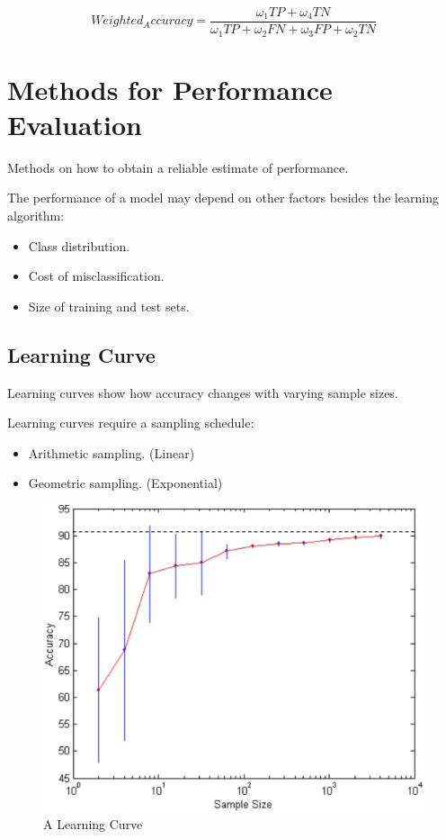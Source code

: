 \begin{equation}
    Weighted_Accuracy = \frac{\omega_1 TP + \omega_4 TN}{\omega_1 TP + \omega_2 FN + \omega_3 FP + \omega_2 TN}
\end{equation}

\section{Methods for Performance Evaluation}
Methods on how to obtain a reliable estimate of performance.

The performance of a model may depend on other factors besides the learning algorithm:
\begin{itemize}
    \item Class distribution.
    \item Cost of misclassification.
    \item Size of training and test sets.
\end{itemize}

\subsection{Learning Curve}
Learning curves show how accuracy changes with varying sample sizes.

Learning curves require a sampling schedule:
\begin{itemize}
    \item Arithmetic sampling. (Linear)
    \item Geometric sampling. (Exponential)
\end{itemize}

\bigskip
\begin{figure}[H]
    \centering
    \includegraphics[scale=0.5]{figures/learningcurve.png}
    \caption{A Learning Curve}
\end{figure}

